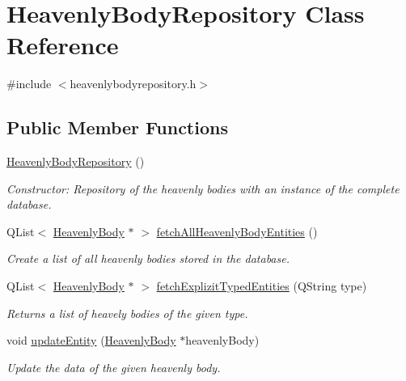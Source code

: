 \hypertarget{classHeavenlyBodyRepository}{
\section{\-Heavenly\-Body\-Repository \-Class \-Reference}
\label{d8/dde/classHeavenlyBodyRepository}
}


{\ttfamily \#include $<$heavenlybodyrepository.\-h$>$}

\subsection*{\-Public \-Member \-Functions}
\begin{DoxyCompactItemize}
\item 
\hyperlink{classHeavenlyBodyRepository_ac3d5ecbaa6079313028df52accaca9d3}{\-Heavenly\-Body\-Repository} ()
\begin{DoxyCompactList}\small\item\em \-Constructor\-: \-Repository of the heavenly bodies with an instance of the complete database. \end{DoxyCompactList}\item 
\-Q\-List$<$ \hyperlink{classHeavenlyBody}{\-Heavenly\-Body} $\ast$ $>$ \hyperlink{classHeavenlyBodyRepository_aa26902de514869deb6683f15b7c8a9e4}{fetch\-All\-Heavenly\-Body\-Entities} ()
\begin{DoxyCompactList}\small\item\em \-Create a list of all heavenly bodies stored in the database. \end{DoxyCompactList}\item 
\-Q\-List$<$ \hyperlink{classHeavenlyBody}{\-Heavenly\-Body} $\ast$ $>$ \hyperlink{classHeavenlyBodyRepository_a1e514d292fb5c3c1ad10f3abfa68b528}{fetch\-Explizit\-Typed\-Entities} (\-Q\-String type)
\begin{DoxyCompactList}\small\item\em \-Returns a list of heavely bodies of the given type. \end{DoxyCompactList}\item 
void \hyperlink{classHeavenlyBodyRepository_a94e952644cedae8e17c89253587838c3}{update\-Entity} (\hyperlink{classHeavenlyBody}{\-Heavenly\-Body} $\ast$heavenly\-Body)
\begin{DoxyCompactList}\small\item\em \-Update the data of the given heavenly body. \end{DoxyCompactList}\item 

\end{DoxyCompactItemize}
